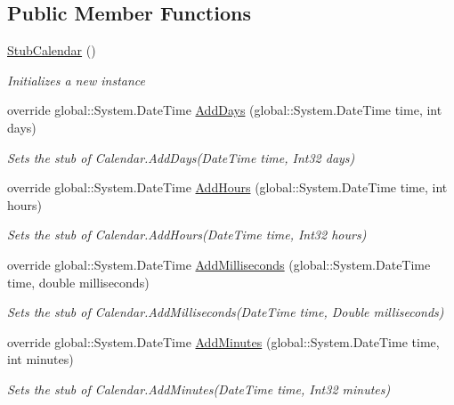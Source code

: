 \subsection*{Public Member Functions}
\begin{DoxyCompactItemize}
\item 
\hyperlink{class_system_1_1_globalization_1_1_fakes_1_1_stub_calendar_a57c14bc67398b97c39e617430853557c}{Stub\-Calendar} ()
\begin{DoxyCompactList}\small\item\em Initializes a new instance\end{DoxyCompactList}\item 
override global\-::\-System.\-Date\-Time \hyperlink{class_system_1_1_globalization_1_1_fakes_1_1_stub_calendar_a38b3cf4666b563031ee5297269b95860}{Add\-Days} (global\-::\-System.\-Date\-Time time, int days)
\begin{DoxyCompactList}\small\item\em Sets the stub of Calendar.\-Add\-Days(\-Date\-Time time, Int32 days)\end{DoxyCompactList}\item 
override global\-::\-System.\-Date\-Time \hyperlink{class_system_1_1_globalization_1_1_fakes_1_1_stub_calendar_a5e88ed8b3d4edf93bf2625a5d38c475f}{Add\-Hours} (global\-::\-System.\-Date\-Time time, int hours)
\begin{DoxyCompactList}\small\item\em Sets the stub of Calendar.\-Add\-Hours(\-Date\-Time time, Int32 hours)\end{DoxyCompactList}\item 
override global\-::\-System.\-Date\-Time \hyperlink{class_system_1_1_globalization_1_1_fakes_1_1_stub_calendar_a0cf9195be0d2e7cfe4d1394b1039b762}{Add\-Milliseconds} (global\-::\-System.\-Date\-Time time, double milliseconds)
\begin{DoxyCompactList}\small\item\em Sets the stub of Calendar.\-Add\-Milliseconds(\-Date\-Time time, Double milliseconds)\end{DoxyCompactList}\item 
override global\-::\-System.\-Date\-Time \hyperlink{class_system_1_1_globalization_1_1_fakes_1_1_stub_calendar_a0a0dc334a790d6c3997f31a52c6a035e}{Add\-Minutes} (global\-::\-System.\-Date\-Time time, int minutes)
\begin{DoxyCompactList}\small\item\em Sets the stub of Calendar.\-Add\-Minutes(\-Date\-Time time, Int32 minutes)\end{DoxyCompactList}\item 

\end{DoxyCompactItemize}
